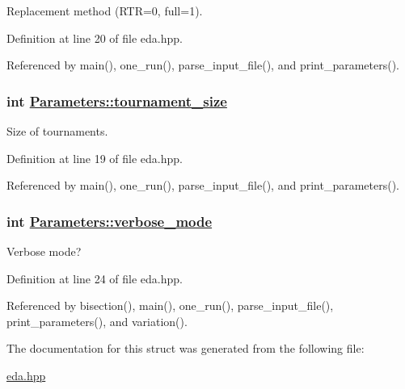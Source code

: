 Replacement method (RTR=0, full=1). 



Definition at line 20 of file eda.hpp.

Referenced by main(), one\_\-run(), parse\_\-input\_\-file(), and print\_\-parameters().\hypertarget{struct_parameters_8b65ec8ae34b43aab58df88d3a4fa160}{
\subsubsection[tournament\_\-size]{\setlength{\rightskip}{0pt plus 5cm}int \hyperlink{struct_parameters_8b65ec8ae34b43aab58df88d3a4fa160}{Parameters::tournament\_\-size}}}
\label{struct_parameters_8b65ec8ae34b43aab58df88d3a4fa160}


Size of tournaments. 



Definition at line 19 of file eda.hpp.

Referenced by main(), one\_\-run(), parse\_\-input\_\-file(), and print\_\-parameters().\hypertarget{struct_parameters_edbef1c42fc849f568bf3dc79398f8a7}{
\subsubsection[verbose\_\-mode]{\setlength{\rightskip}{0pt plus 5cm}int \hyperlink{struct_parameters_edbef1c42fc849f568bf3dc79398f8a7}{Parameters::verbose\_\-mode}}}
\label{struct_parameters_edbef1c42fc849f568bf3dc79398f8a7}


Verbose mode? 



Definition at line 24 of file eda.hpp.

Referenced by bisection(), main(), one\_\-run(), parse\_\-input\_\-file(), print\_\-parameters(), and variation().

The documentation for this struct was generated from the following file:\begin{CompactItemize}
\item 
\hyperlink{eda_8hpp}{eda.hpp}\end{CompactItemize}

